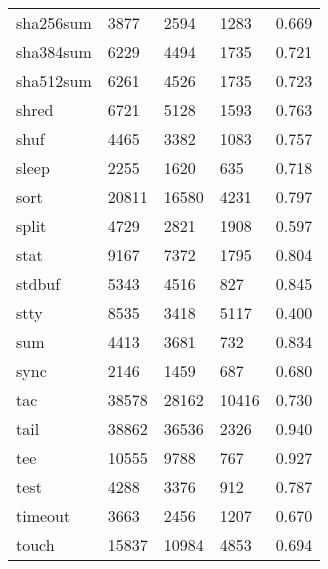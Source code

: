 \begin{longtable}{lp{3.0cm}p{3.0cm}p{3.0cm}p{3.0cm}}
sha256sum &                     3877 &         2594 &          1283 &                    0.669 \\
sha384sum &                     6229 &         4494 &          1735 &                    0.721 \\
sha512sum &                     6261 &         4526 &          1735 &                    0.723 \\
shred     &                     6721 &         5128 &          1593 &                    0.763 \\
shuf      &                     4465 &         3382 &          1083 &                    0.757 \\
sleep     &                     2255 &         1620 &           635 &                    0.718 \\
sort      &                    20811 &        16580 &          4231 &                    0.797 \\
split     &                     4729 &         2821 &          1908 &                    0.597 \\
stat      &                     9167 &         7372 &          1795 &                    0.804 \\
stdbuf    &                     5343 &         4516 &           827 &                    0.845 \\
stty      &                     8535 &         3418 &          5117 &                    0.400 \\
sum       &                     4413 &         3681 &           732 &                    0.834 \\
sync      &                     2146 &         1459 &           687 &                    0.680 \\
tac       &                    38578 &        28162 &         10416 &                    0.730 \\
tail      &                    38862 &        36536 &          2326 &                    0.940 \\
tee       &                    10555 &         9788 &           767 &                    0.927 \\
test      &                     4288 &         3376 &           912 &                    0.787 \\
timeout   &                     3663 &         2456 &          1207 &                    0.670 \\
touch     &                    15837 &        10984 &          4853 &                    0.694 \\

\end{longtable}
